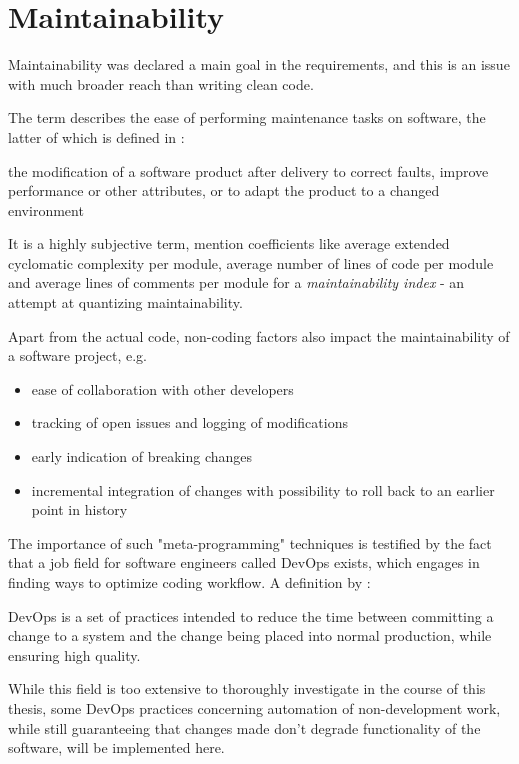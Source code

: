 \section{Maintainability}\label{sec:maintainability}
Maintainability was declared a main goal in the requirements, and this is an issue with much broader reach than writing clean code.

The term describes the ease of performing maintenance tasks on software, the latter of which is defined in \citet[p.234]{Bray1997} :
\begin{definition}[maintenance]
the modification of a software product after delivery to correct faults, improve performance or other attributes, or to adapt the product to a changed environment
\end{definition}

It is a highly subjective term, \citet[p.231]{Bray1997} mention coefficients like average extended cyclomatic complexity per module, average number of lines of code per module and average lines of comments per module for a \textit{maintainability index} - an attempt at quantizing maintainability.

Apart from the actual code, non-coding factors also impact the maintainability of a software project, e.g.
\begin{itemize}
	\item ease of collaboration with other developers
	\item tracking of open issues and logging of modifications
	\item early indication of breaking changes
	\item incremental integration of changes with possibility to roll back to an earlier point in history
\end{itemize}

The importance of such "meta-programming" techniques is testified by the fact that a job field for software engineers called \gls{DevOps} exists, which engages in finding ways to optimize coding workflow.
A definition by \citet[p.23]{Bass2015}:
\begin{definition}[DevOps]
	DevOps is a set of practices intended to reduce the time between committing a change to a system and the change being placed into normal production, while ensuring high quality.
\end{definition}

While this field is too extensive to thoroughly investigate in the course of this thesis, some DevOps practices concerning automation of non-development work, while still guaranteeing that changes made don't degrade functionality of the software, will be implemented here. 

